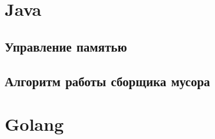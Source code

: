 \section{Java}
\subsection{Управление памятью}
\subsection{Алгоритм работы сборщика мусора}

%
%
%
%
%
%
%
%
%
%
%
%
%
%
%
%
%
%
%
%
%
%
%
%
%
%
%
%
%
%
%
%
%
%
%
%
%



\section{Golang}
